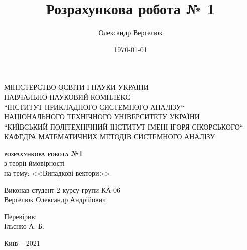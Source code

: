 \documentclass[14pt, a4paper, ukrainian]{article}
\title{Розрахункова робота № 1}
\author{Олександр Вергелюк}
\date{\today}
\begin{document}
\begin{titlepage}
	\centering
	\vspace{1cm}
	{ МІНІСТЕРСТВО ОСВІТИ І НАУКИ УКРАЇНИ\\
		НАВЧАЛЬНО-НАУКОВИЙ КОМПЛЕКС\\
		``ІНСТИТУТ ПРИКЛАДНОГО СИСТЕМНОГО АНАЛІЗУ``\\
		НАЦІОНАЛЬНОГО ТЕХНІЧНОГО УНІВЕРСИТЕТУ УКРАЇНИ\\
		``КИЇВСЬКИЙ ПОЛІТЕХНІЧНИЙ ІНСТИТУТ ІМЕНІ ІГОРЯ СІКОРСЬКОГО``\\
		КАФЕДРА МАТЕМАТИЧНИХ МЕТОДІВ  СИСТЕМНОГО АНАЛІЗУ\\\par}
	\vspace{5cm}
\Large \textsc{\textbf{розрахункова робота №1}}\\
\large {з теорії ймовірності} \\
на тему: {<<Випадкові вектори>>}
\vfill
\newlength{\ML}
\settowidth{\ML}{\hspace{3.4cm}}
\hfill
\begin{minipage}{0.4\textwidth}
	Виконав студент 2 курсу групи КА-06\\
	Вергелюк Олександр Андрійович
	
	Перевірив: \\
	Ільєнко А. Б.
\end{minipage}
\vfill
\begin{center}
Київ -- 2021
\end{center}
\end{titlepage}
	
	
\end{document}
